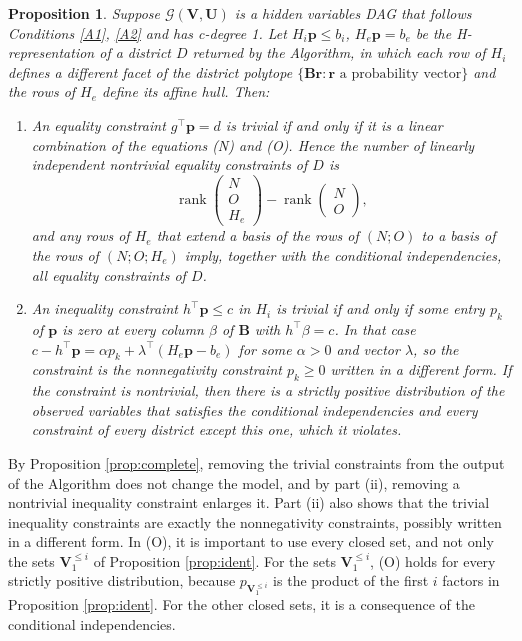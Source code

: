 \documentclass[12pt]{article}
\newtheorem{proposition}{Proposition}
\newcommand{\bU}{\boldsymbol{U}}
\newcommand{\bV}{\boldsymbol{V}}
\DeclareMathOperator{\rank}{rank}
\begin{document}
\begin{proposition} \label{prop:nontrivial}
Suppose $\mathcal{G}(\bV, \bU)$ is a hidden variables DAG that follows Conditions \ref{A1}, \ref{A2} and has c-degree 1. Let $H_i \boldsymbol{p} \leq b_i$, $H_e \boldsymbol{p} = b_e$ be the H-representation of a district $D$ returned by the Algorithm, in which each row of $H_i$ defines a different facet of the district polytope $\{\boldsymbol{B}\boldsymbol{r} : \boldsymbol{r} \text{ a probability vector}\}$ and the rows of $H_e$ define its affine hull. Then:
\begin{enumerate}
\item[(i)] An equality constraint $g^\top \boldsymbol{p} = d$ is trivial if and only if it is a linear combination of the equations (N) and (O). Hence the number of linearly independent nontrivial equality constraints of $D$ is
\[
\rank\begin{pmatrix} N \\ O \\ H_e \end{pmatrix} - \rank\begin{pmatrix} N \\ O \end{pmatrix},
\]
and any rows of $H_e$ that extend a basis of the rows of $(N; O)$ to a basis of the rows of $(N; O; H_e)$ imply, together with the conditional independencies, all equality constraints of $D$.
\item[(ii)] An inequality constraint $h^\top \boldsymbol{p} \leq c$ in $H_i$ is trivial if and only if some entry $p_k$ of $\boldsymbol{p}$ is zero at every column $\beta$ of $\boldsymbol{B}$ with $h^\top \beta = c$. In that case $c - h^\top \boldsymbol{p} = \alpha p_k + \lambda^\top (H_e \boldsymbol{p} - b_e)$ for some $\alpha > 0$ and vector $\lambda$, so the constraint is the nonnegativity constraint $p_k \geq 0$ written in a different form. If the constraint is nontrivial, then there is a strictly positive distribution of the observed variables that satisfies the conditional independencies and every constraint of every district except this one, which it violates.
\end{enumerate}
\end{proposition}

By Proposition \ref{prop:complete}, removing the trivial constraints from the output of the Algorithm does not change the model, and by part (ii), removing a nontrivial inequality constraint enlarges it. Part (ii) also shows that the trivial inequality constraints are exactly the nonnegativity constraints, possibly written in a different form. In (O), it is important to use every closed set, and not only the sets $\bV_1^{\leq i}$ of Proposition \ref{prop:ident}. For the sets $\bV_1^{\leq i}$, (O) holds for every strictly positive distribution, because $p_{\bV_1^{\leq i}}$ is the product of the first $i$ factors in Proposition \ref{prop:ident}. For the other closed sets, it is a consequence of the conditional independencies.
\end{document}
